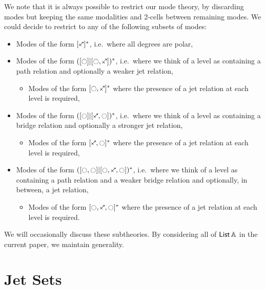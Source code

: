 \documentclass[a4paper]{memoir}
\begin{document}
\begin{remark} 
	We note that it is always possible to restrict our mode theory, by discarding modes but keeping the same modalities and 2-cells between remaining modes.
	We could decide to restrict to any of the following subsets of modes:
	\begin{itemize}
		\item Modes of the form $[\ypolar]^*$, i.e.\ where all degrees are polar,
		\item Modes of the form $([\npolar] | [\npolar, \ypolar])^*$, i.e.\ where we think of a level as containing a path relation and optionally a weaker jet relation,
		\begin{itemize}
			\item Modes of the form $[\npolar, \ypolar]^*$ where the presence of a jet relation at each level is required,
		\end{itemize}
		\item Modes of the form $([\npolar] | [\ypolar, \npolar])^*$, i.e.\ where we think of a level as containing a bridge relation and optionally a stronger jet relation,
		\begin{itemize}
			\item Modes of the form $[\ypolar, \npolar]^*$ where the presence of a jet relation at each level is required,
		\end{itemize}
		\item Modes of the form $([\npolar, \npolar] | [\npolar, \ypolar, \npolar])^*$, i.e.\ where we think of a level as containing a path relation and a weaker bridge relation and optionally, in between, a jet relation,
		\begin{itemize}
			\item Modes of the form $[\npolar, \ypolar, \npolar]^*$ where the presence of a jet relation at each level is required.
		\end{itemize}
	\end{itemize}
	We will occasionally discuss these subtheories. By considering all of ${\mathsf{List}}\,{\mathbb{A}}$ in the current paper, we maintain generality.
\end{remark}

\section{Jet Sets}
\end{document}
